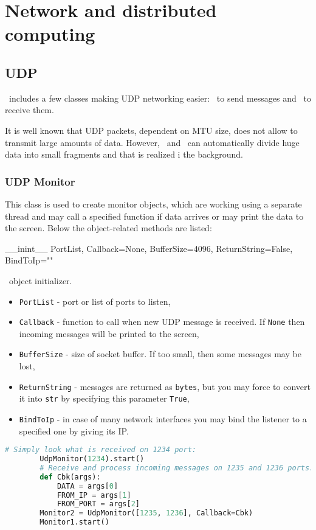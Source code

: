 \chapter{Network and distributed computing}

\section{UDP}

\ShellName\ includes a few classes making UDP networking easier: \UdpSender\ to send messages and \UdpMonitor\ to receive them. 

It is well known that UDP packets, dependent on MTU size, does not allow to transmit large amounts of data. However, \UdpSender\ and \UdpMonitor\ can automatically divide huge data into small fragments and that is realized i the background.

\subsection{UDP Monitor}

This class is used to create monitor objects, which are working using a separate thread and may call a specified function if data arrives or may print the data to the screen. Below the object-related methods are listed:

 {\_\_inint\_\_} {PortList, Callback=None, BufferSize=4096, ReturnString=False, BindToIp=""} {
	\UdpMonitor\ object initializer.
	\begin{itemize}
		\item \texttt{PortList} - port or list of ports to listen,
		\item \texttt{Callback} - function to call when new UDP message is received. If \texttt{None} then incoming messages will be printed to the screen,
		\item \texttt{BufferSize} - size of socket buffer. If too small, then some messages may be lost,
		\item \texttt{ReturnString} - messages are returned as \texttt{bytes}, but you may force to convert it into \texttt{str} by specifying this parameter \texttt{True},
		\item \texttt{BindToIp} - in case of many network interfaces you may bind the listener to a specified one by giving its IP. 
	\end{itemize}
}
\begin{lstlisting}[language=Python]
		# Simply look what is received on 1234 port:
		UdpMonitor(1234).start()
		# Receive and process incoming messages on 1235 and 1236 ports:
		def Cbk(args):
			DATA = args[0]
			FROM_IP = args[1]
			FROM_PORT = args[2]
		Monitor2 = UdpMonitor([1235, 1236], Callback=Cbk)
		Monitor1.start()
\end{lstlisting}

